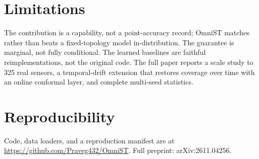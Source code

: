 \documentclass[conference]{IEEEtran}
\newcommand{\repourl}{https://github.com/Praveg432/OmniST}
\begin{document}
\section{Limitations}
The contribution is a capability, not a point-accuracy record; OmniST matches rather than beats a
fixed-topology model in-distribution. The guarantee is marginal, not fully conditional. The learned
baselines are faithful reimplementations, not the original code. The full paper reports a scale study to
325 real sensors, a temporal-drift extension that restores coverage over time with an online conformal
layer, and complete multi-seed statistics.

\section*{Reproducibility}
Code, data loaders, and a reproduction manifest are at \url{\repourl}. Full preprint: arXiv:2611.04256.



\end{document}
